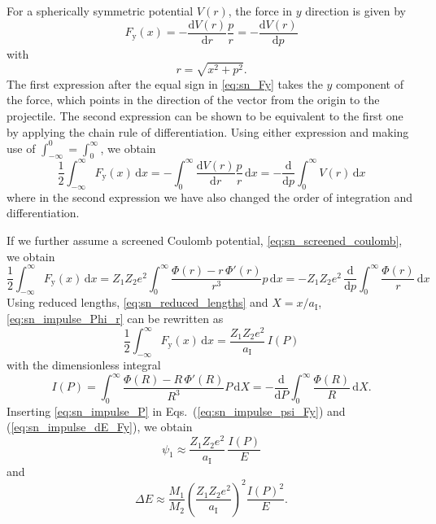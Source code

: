 For a spherically symmetric potential $V(r)$, the force in $y$ direction is given by
%
\begin{equation}
    \label{eq:sn_Fy}
    F_\mathrm{y}(x) = - \frac{\mathrm{d} V(r)}{\mathrm{d} r} \frac{p}{r}
        = - \frac{\mathrm{d} V(r)}{\mathrm{d} p}
\end{equation}
%
with
%
\begin{equation}
    \label{eq_sn_r_from_x}
    r = \sqrt{x^2 + p^2} .
\end{equation}
%
The first expression after the equal sign in \cref{eq:sn_Fy} takes the $y$ component of the force, which points in the direction of the vector from the origin to the projectile.
The second expression can be shown to be equivalent to the first one by applying the chain rule of differentiation.
Using either expression and making use of $\int_{-\infty}^0 = \int_0^\infty$, we obtain
%
\begin{equation}
    \label{eq:sn_impulse_V}
    \frac{1}{2} \int_{-\infty}^{\infty} F_\mathrm{y}(x) \, \mathrm{d}x
    = - \int_{0}^{\infty} \frac{\mathrm{d} V(r)}{\mathrm{d} r}
        \frac{p}{r} \, \mathrm{d}x
    = - \frac{\mathrm{d}}{\mathrm{d} p} \int_{0}^{\infty} V(r)
        \, \mathrm{d}x
\end{equation}
%
where in the second expression we have also changed the order of integration and differentiation.

If we further assume a screened Coulomb potential, \cref{eq:sn_screened_coulomb}, we obtain
%
\begin{equation}
    \label{eq:sn_impulse_Phi_r}
    \frac{1}{2} \int_{-\infty}^{\infty} F_\mathrm{y}(x) \, \mathrm{d}x
    = Z_1 Z_2 e^2
        \int_{0}^{\infty} \frac{\Phi(r) - r \, \Phi'(r)}{r^3} p
        \, \mathrm{d}x
    = - Z_1 Z_2 e^2 \, \frac{\mathrm{d}}{\mathrm{d} p} \int_{0}^{\infty} \frac{\Phi(r)}{r}
    \, \mathrm{d}x
\end{equation}
%
Using reduced lengths, \cref{eq:sn_reduced_lengths} and $X = x/a_\mathrm{I}$, \cref{eq:sn_impulse_Phi_r} can be rewritten as
%
\begin{equation}
    \label{eq:sn_impulse_P}
    \frac{1}{2} \int_{-\infty}^{\infty} F_\mathrm{y}(x) \, \mathrm{d}x
    = \frac{Z_1 Z_2 e^2}{a_\mathrm{I}} \, I(P)
\end{equation}
%
with the dimensionless integral
%
\begin{equation}
    \label{eq:sn_impulse_Phi_R}
    I(P)
    = \int_{0}^{\infty} \frac{\Phi(R) - R \, \Phi'(R)}{R^3} P \, \mathrm{d}X
    = - \frac{\mathrm{d}}{\mathrm{d} P} \int_{0}^{\infty} \frac{\Phi(R)}{R}
        \, \mathrm{d}X .
\end{equation}
%
Inserting \cref{eq:sn_impulse_P} in Eqs.~(\ref{eq:sn_impulse_psi_Fy}) and (\ref{eq:sn_impulse_dE_Fy}), we obtain
%
\begin{equation}
    \label{eq:sn_impulse_psi_I}
    \psi_1 \approx \frac{Z_1 Z_2 e^2}{a_\mathrm{I}} \, \frac{I(P)}{E}
\end{equation}
%
and
%
\begin{equation}
    \label{eq:sn_impulse_dE_I}
    \Delta E \approx  \frac{M_1}{M_2} \left(
        \frac{Z_1 Z_2 e^2}{a_\mathrm{I}}
    \right) ^2
    \frac{I(P)^2}{E} .
\end{equation}

